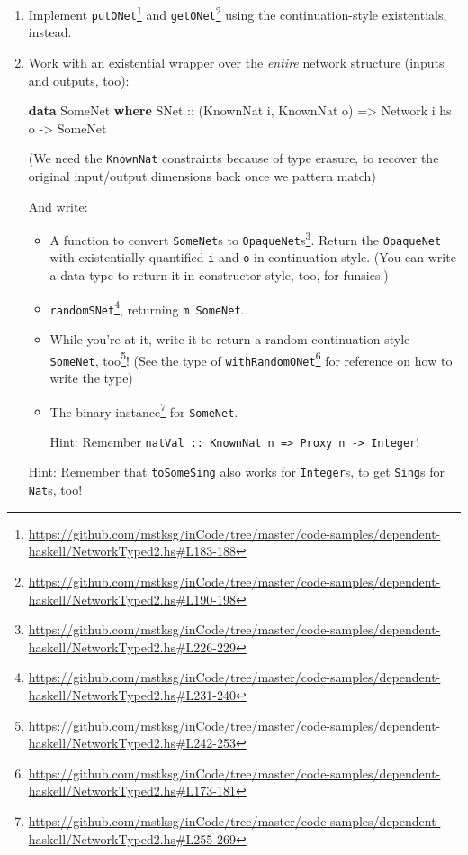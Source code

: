 \documentclass[]{article}
\newenvironment{Shaded}{}{}
\newcommand{\KeywordTok}[1]{\textcolor[rgb]{0.00,0.44,0.13}{\textbf{{#1}}}}
\newcommand{\DataTypeTok}[1]{\textcolor[rgb]{0.56,0.13,0.00}{{#1}}}
\newcommand{\OtherTok}[1]{\textcolor[rgb]{0.00,0.44,0.13}{{#1}}}
\newcommand{\NormalTok}[1]{{#1}}
\renewcommand{\href}[2]{#2\footnote{\url{#1}}}
\begin{document}
\begin{enumerate}
\def\labelenumi{\arabic{enumi}.}
\item
  Implement
  \href{https://github.com/mstksg/inCode/tree/master/code-samples/dependent-haskell/NetworkTyped2.hs\#L183-188}{\texttt{putONet\textquotesingle{}}}
  and
  \href{https://github.com/mstksg/inCode/tree/master/code-samples/dependent-haskell/NetworkTyped2.hs\#L190-198}{\texttt{getONet\textquotesingle{}}}
  using the continuation-style existentials, instead.
\item
  Work with an existential wrapper over the \emph{entire} network structure
  (inputs and outputs, too):

\begin{Shaded}
\begin{Highlighting}[]
\KeywordTok{data} \DataTypeTok{SomeNet} \KeywordTok{where}
    \DataTypeTok{SNet}\OtherTok{ ::} \NormalTok{(}\DataTypeTok{KnownNat} \NormalTok{i, }\DataTypeTok{KnownNat} \NormalTok{o)}
         \OtherTok{=>} \DataTypeTok{Network} \NormalTok{i hs o}
         \OtherTok{->} \DataTypeTok{SomeNet}
\end{Highlighting}
\end{Shaded}

  (We need the \texttt{KnownNat} constraints because of type erasure, to recover
  the original input/output dimensions back once we pattern match)

  And write:

  \begin{itemize}
  \item
    A function to
    \href{https://github.com/mstksg/inCode/tree/master/code-samples/dependent-haskell/NetworkTyped2.hs\#L226-229}{convert
    \texttt{SomeNet}s to \texttt{OpaqueNet}s}. Return the \texttt{OpaqueNet}
    with existentially quantified \texttt{i} and \texttt{o} in
    continuation-style. (You can write a data type to return it in
    constructor-style, too, for funsies.)
  \item
    \href{https://github.com/mstksg/inCode/tree/master/code-samples/dependent-haskell/NetworkTyped2.hs\#L231-240}{\texttt{randomSNet}},
    returning \texttt{m\ SomeNet}.
  \item
    While you're at it, write it to return
    \href{https://github.com/mstksg/inCode/tree/master/code-samples/dependent-haskell/NetworkTyped2.hs\#L242-253}{a
    random continuation-style \texttt{SomeNet}, too}! (See the type of
    \href{https://github.com/mstksg/inCode/tree/master/code-samples/dependent-haskell/NetworkTyped2.hs\#L173-181}{\texttt{withRandomONet\textquotesingle{}}}
    for reference on how to write the type)
  \item
    The
    \href{https://github.com/mstksg/inCode/tree/master/code-samples/dependent-haskell/NetworkTyped2.hs\#L255-269}{binary
    instance} for \texttt{SomeNet}.

    Hint: Remember
    \texttt{natVal\ ::\ KnownNat\ n\ =\textgreater{}\ Proxy\ n\ -\textgreater{}\ Integer}!
  \end{itemize}

  Hint: Remember that \texttt{toSomeSing} also works for \texttt{Integer}s, to
  get \texttt{Sing}s for \texttt{Nat}s, too!
\end{enumerate}
\end{document}
